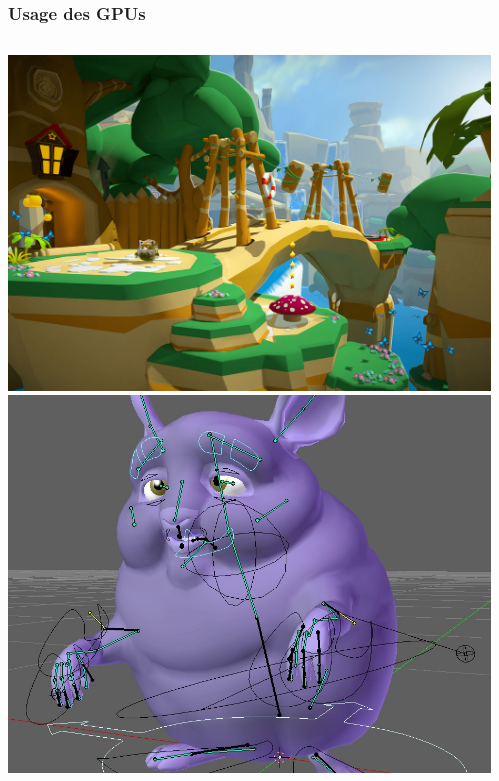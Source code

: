 \begin{frame}
  \frametitle{Usage des GPUs}
  \begin{columns}
    \begin{column}{.25\textwidth}
      \begin{center}
        \includegraphics[width=1.\textwidth]{images/game.jpg} \\[5mm]
        \includegraphics[width=1.\textwidth]{images/blender.jpg}
      \end{center}
    \end{column}
    \begin{column}{.25\textwidth}
      \begin{center}

\end{center}
\end{column}
\end{columns}
\end{frame}
